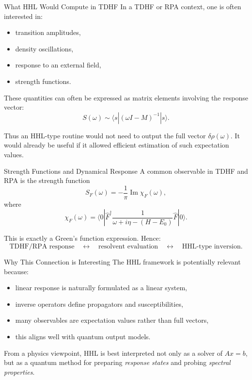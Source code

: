 \documentclass{beamer}
\begin{document}

\begin{frame}{What HHL Would Compute in TDHF}
  In a TDHF or RPA context, one is often interested in:
  \begin{itemize}
  \item transition amplitudes,
  \item density oscillations,
  \item response to an external field,
  \item strength functions.
  \end{itemize}

  These quantities can often be expressed as matrix elements involving the response vector:
  \[
  S(\omega) \sim \langle s | (\omega I - M)^{-1} | s \rangle.
  \]

  Thus an HHL-type routine would not need to output the full vector \(\delta\rho(\omega)\). It would already be useful if it allowed efficient estimation of such expectation values.
\end{frame}


\begin{frame}{Strength Functions and Dynamical Response}
  A common observable in TDHF and RPA is the strength function
  \[
  S_F(\omega)
  =
  -\frac{1}{\pi}\operatorname{Im}\chi_F(\omega),
  \]
  where
  \[
  \chi_F(\omega)
  =
  \langle 0|\hat{F}^\dagger
  \frac{1}{\omega + i\eta - (H-E_0)}
  \hat{F}|0\rangle.
  \]

  This is exactly a Green's function expression. Hence:
  \[
  \text{TDHF/RPA response}
  \quad \longleftrightarrow \quad
  \text{resolvent evaluation}
  \quad \longleftrightarrow \quad
  \text{HHL-type inversion}.
  \]
\end{frame}


\begin{frame}{Why This Connection is Interesting}
  The HHL framework is potentially relevant because:
  \begin{itemize}
  \item linear response is naturally formulated as a linear system,
  \item inverse operators define propagators and susceptibilities,
  \item many observables are expectation values rather than full vectors,
  \item this aligns well with quantum output models.
  \end{itemize}

  From a physics viewpoint, HHL is best interpreted not only as a solver of \(Ax=b\), but as a quantum method for preparing \emph{response states} and probing \emph{spectral properties}.
\end{frame}
\end{document}
